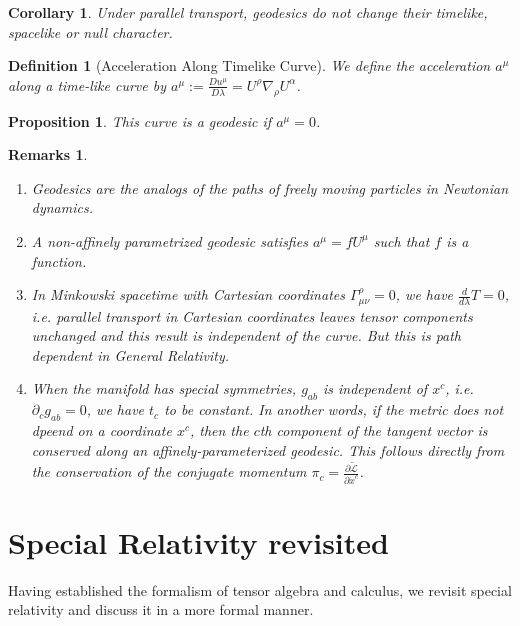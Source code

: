 \documentclass[a4paper]{article}
\newtheorem{remarks}{Remarks}[section]
\theoremstyle{new}
\newtheorem{defi}{Definition}[section]
\newtheorem{prop}{Proposition}[section]
\newtheorem{cor}{Corollary}[section]
\begin{document}
\begin{cor}
Under parallel transport, geodesics do not change their timelike, spacelike or null character.
\end{cor}
\begin{defi}[Acceleration Along Timelike Curve]
We define the acceleration $a^\mu$ along a time-like curve by $a^\mu:=\frac{Du^\mu}{D\lambda}=U^\rho\nabla_\rho U^\alpha$.
\end{defi}
\begin{prop}
This curve is a geodesic if $a^\mu=0$. 
\end{prop}
\begin{remarks}\leavevmode
\begin{enumerate}
    \item Geodesics are the analogs of the paths of freely moving particles in Newtonian dynamics.
    \item A non-affinely parametrized geodesic satisfies $a^\mu=fU^\mu$ such that $f$ is a function.
    \item In Minkowski spacetime with Cartesian coordinates $\Gamma_{\mu\nu}^\rho=0$, we have $\frac{d}{d\lambda}T=0$, i.e. parallel transport in Cartesian coordinates leaves tensor components unchanged and this result is independent of the curve. But this is path dependent in General Relativity.
    \item When the manifold has special symmetries, $g_{ab}$ is independent of $x^c$, i.e. $\partial_cg_{ab}=0$, we have $t_c$ to be constant. In another words, if the metric does not dpeend on a coordinate $x^c$, then the $c$th component of the tangent vector is conserved along an affinely-parameterized geodesic. This follows directly from the conservation of the conjugate momentum $\pi_c=\frac{\partial\tilde{\mathcal{L}}}{\partial\dot{x}^c}$.
\end{enumerate}
\end{remarks}

\newpage
\section{Special Relativity revisited}
Having established the formalism of tensor algebra and calculus, we revisit special relativity and discuss it in a more formal manner.
\end{document}
